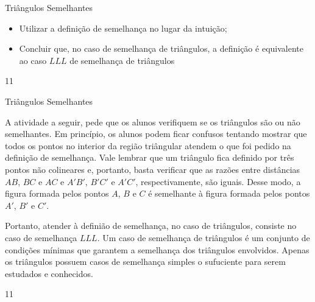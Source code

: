 \def\currentcolor{session1}
\begin{objectives}{Triângulos Semelhantes}
{\begin{itemize}
\item {} 
Utilizar a definição de semelhança no lugar da intuição;

\item {} 
Concluir que, no caso de semelhança de triângulos, a definição é equivalente ao caso $LLL$ de semelhança de triângulos

\end{itemize}}
{1}{1}
\end{objectives}
\begin{sugestions}{Triângulos Semelhantes}
{A atividade a seguir, pede que os alunos verifiquem se os triângulos são ou não semelhantes. Em princípio, os alunos podem ficar confusos tentando mostrar que todos os pontos no interior da região triângular atendem o que foi pedido na definição de semelhança. Vale lembrar que um triângulo fica definido por três pontos não colineares e, portanto, basta verificar que as razões entre distâncias \(AB\), \(BC\) e \(AC\) e \(A'B'\), \(B'C'\) e \(A'C'\), respectivamente, são iguais. Desse modo, a figura formada pelos pontos \(A\), \(B\) e \(C\) é semelhante à figura formada pelos pontos \(A'\), \(B'\) e \(C'\).

Portanto, atender à definião de semelhança, no caso de triângulos, consiste no caso de semelhança \(LLL\). Um caso de semelhança de triângulos é um conjunto de condições mínimas que garantem a semelhança dos triângulos envolvidos. Apenas os triângulos possuem casos de semelhança simples o sufuciente para serem estudados e conhecidos.}
{1}{1}
\end{sugestions}
